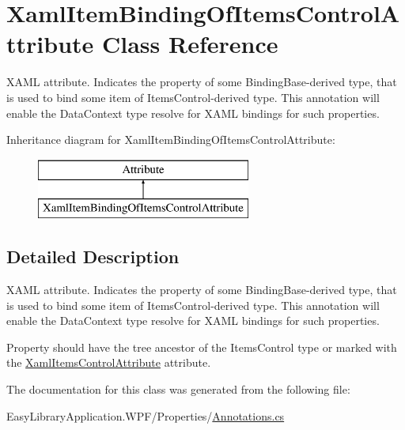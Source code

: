 \hypertarget{class_xaml_item_binding_of_items_control_attribute}{}\section{Xaml\+Item\+Binding\+Of\+Items\+Control\+Attribute Class Reference}
\label{class_xaml_item_binding_of_items_control_attribute}


X\+A\+ML attribute. Indicates the property of some {\ttfamily Binding\+Base}-\/derived type, that is used to bind some item of {\ttfamily Items\+Control}-\/derived type. This annotation will enable the {\ttfamily Data\+Context} type resolve for X\+A\+ML bindings for such properties.  


Inheritance diagram for Xaml\+Item\+Binding\+Of\+Items\+Control\+Attribute\+:\begin{figure}[H]
\begin{center}
\leavevmode
\includegraphics[height=2.000000cm]{class_xaml_item_binding_of_items_control_attribute}
\end{center}
\end{figure}


\subsection{Detailed Description}
X\+A\+ML attribute. Indicates the property of some {\ttfamily Binding\+Base}-\/derived type, that is used to bind some item of {\ttfamily Items\+Control}-\/derived type. This annotation will enable the {\ttfamily Data\+Context} type resolve for X\+A\+ML bindings for such properties. 

Property should have the tree ancestor of the {\ttfamily Items\+Control} type or marked with the \mbox{\hyperlink{class_xaml_items_control_attribute}{Xaml\+Items\+Control\+Attribute}} attribute. 

The documentation for this class was generated from the following file\+:\begin{DoxyCompactItemize}
\item 
Easy\+Library\+Application.\+W\+P\+F/\+Properties/\mbox{\hyperlink{_annotations_8cs}{Annotations.\+cs}}\end{DoxyCompactItemize}

